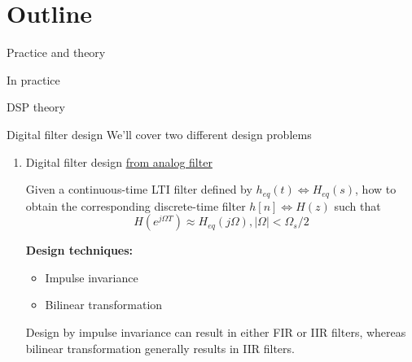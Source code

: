 \documentclass[10pt, handout]{beamer}
\begin{document}
%
\section{Outline}

\begin{frame}{Practice and theory}
\begin{block}{In practice}
	\vspace{-0.5cm}
	\begin{center}
		\resizebox{\linewidth}{!}{}
	\end{center}
\end{block}

\begin{block}{DSP theory}
	\vspace{-0.5cm}
	\begin{center}
		\def\Heff{1}
		\resizebox{\linewidth}{!}{}
	\end{center}
\end{block}

\end{frame}

\begin{frame}{Digital filter design}
	We'll cover two different design problems
	\begin{enumerate}
		\item Digital filter design \underline{from analog filter}
		
		Given a continuous-time LTI filter defined by $h_{eq}(t) \Longleftrightarrow H_{eq}(s)$, how to obtain the corresponding discrete-time filter $h[n] \Longleftrightarrow H(z)$ such that
		\begin{equation*}
			H(e^{j\Omega T}) \approx H_{eq}(j\Omega), |\Omega| < \Omega_s/2
		\end{equation*}
		
		\textbf{Design techniques:}
		\begin{itemize}
			\item Impulse invariance
			\item Bilinear transformation
		\end{itemize}
		Design by impulse invariance can result in either FIR or IIR filters, whereas bilinear transformation generally results in IIR filters. 
	\end{enumerate}
\end{frame}
\end{document}

